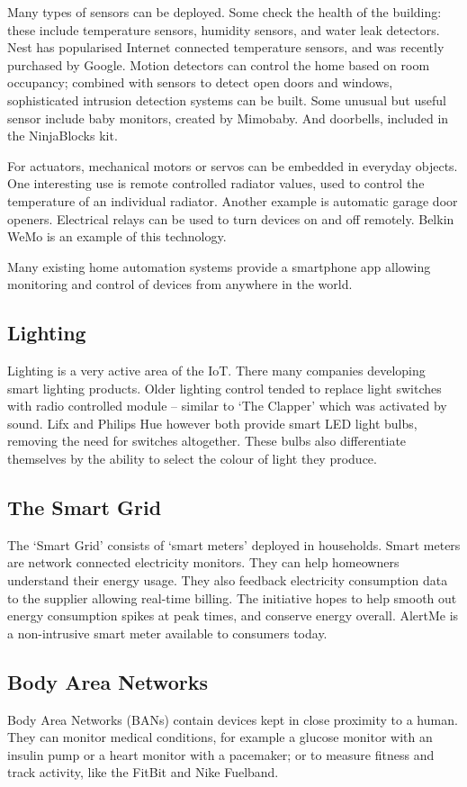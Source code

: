 \documentclass[10pt,journal,compsoc]{IEEEtran}
\begin{document}
Many types of sensors can be deployed. Some check the health of the building:
these include temperature sensors, humidity sensors, and water leak detectors.
Nest has popularised Internet connected temperature sensors, and was recently
purchased by Google. Motion detectors can control the home based on
room occupancy; combined with sensors to detect open doors and windows,
sophisticated intrusion detection systems can be built. Some unusual but useful
sensor include baby monitors, created by Mimobaby. And doorbells, included in
the NinjaBlocks kit. 

For actuators, mechanical motors or servos can be embedded in everyday objects.
One interesting use is remote controlled radiator values, used to control the
temperature of an individual radiator. Another example is automatic garage door
openers. Electrical relays can be used to turn devices on and off remotely.
Belkin WeMo is an example of this technology.

Many existing home automation systems provide a smartphone app allowing
monitoring and control of devices from anywhere in the world. 

\subsection{Lighting}
Lighting is a very active area of the IoT. There many companies developing
smart lighting products. Older lighting control tended to replace light
switches with radio controlled module -- similar to `The Clapper' which was
activated by sound.  Lifx and Philips Hue however both provide smart LED light
bulbs, removing the need for switches altogether. These bulbs also
differentiate themselves by the ability to select the colour of light they
produce.  

\subsection{The Smart Grid}
The `Smart Grid' consists of `smart meters' deployed in households.  Smart
meters are network connected electricity monitors. They can help homeowners
understand their energy usage. They also feedback electricity consumption data
to the supplier allowing real-time billing. The initiative hopes to help smooth
out energy consumption spikes at peak times, and conserve energy overall.
AlertMe is a non-intrusive smart meter available to consumers today. 

\subsection{Body Area Networks}
Body Area Networks (BANs) contain devices kept in close proximity to a human.
They can monitor medical conditions, for example a glucose monitor with an
insulin pump or a heart monitor with a pacemaker; or to measure fitness and
track activity, like the FitBit and Nike Fuelband. 
\end{document}
